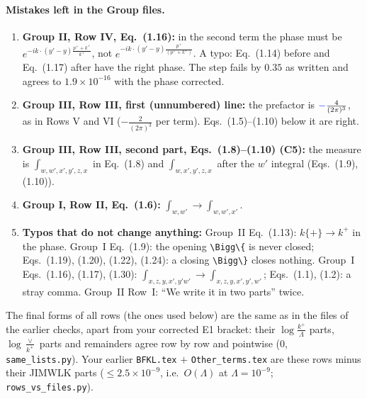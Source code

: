 \documentclass[10pt]{article}
\numberwithin{equation}{section}
\newcommand{\new}[1]{{\color{blue}#1}}
\begin{document}
\paragraph{Mistakes left in the Group files.}
\begin{enumerate}
\item[\textbf{M2}] \textbf{Group II, Row IV, Eq.~(1.16):} in the second term the phase must be $e^{-ik\cdot(y'-y)\frac{p^++k^+}{k^+}}$, not $e^{-ik\cdot(y'-y)\frac{p^+}{(p^++k^+)}}$. A typo: Eq.~(1.14) before and Eq.~(1.17) after have the right phase. The step fails by $0.35$ as written and agrees to $1.9\times10^{-16}$ with the phase corrected.
\item[\textbf{M3}] \textbf{Group III, Row III, first (unnumbered) line:} the prefactor is $\new{-}\frac{4}{(2\pi)^3}$, as in Rows V and VI ($-\frac{2}{(2\pi)^3}$ per term). Eqs.~(1.5)--(1.10) below it are right.
\item[\textbf{M4}] \textbf{Group III, Row III, second part, Eqs.~(1.8)--(1.10) (C5):} the measure is $\int_{w,w',x',y',z,x}$ in Eq.~(1.8) and $\int_{w,x',y',z,x}$ after the $w'$ integral (Eqs.~(1.9), (1.10)).
\item[\textbf{M5}] \textbf{Group I, Row II, Eq.~(1.6):} $\int_{w,w'}\to\int_{w,w',x'}$.
\item[\textbf{M6}] \textbf{Typos that do not change anything:} Group~II Eq.~(1.13): $k\{+\}\to k^+$ in the phase. Group~I Eq.~(1.9): the opening \texttt{\textbackslash Bigg\textbackslash\{} is never closed; Eqs.~(1.19), (1.20), (1.22), (1.24): a closing \texttt{\textbackslash Bigg\textbackslash\}} closes nothing. Group~I Eqs.~(1.16), (1.17), (1.30): $\int_{x,z,y,x',y'w'}\to\int_{x,z,y,x',y',w'}$; Eqs.~(1.1), (1.2): a stray comma. Group~II Row~I: ``We write it in two parts'' twice.
\end{enumerate}
\noindent The final forms of all rows (the ones used below) are the same as in the files of the earlier checks, apart from your corrected E1 bracket: their $\log\frac{k^+}{\Lambda}$ parts, $\log\frac{\vee}{k^+}$ parts and remainders agree row by row and pointwise ($0$, \texttt{same\_lists.py}). Your earlier \texttt{BFKL.tex} $+$ \texttt{Other\_terms.tex} are these rows minus their JIMWLK parts ($\le2.5\times10^{-9}$, i.e.\ $O(\Lambda)$ at $\Lambda=10^{-9}$; \texttt{rows\_vs\_files.py}).
\end{document}
